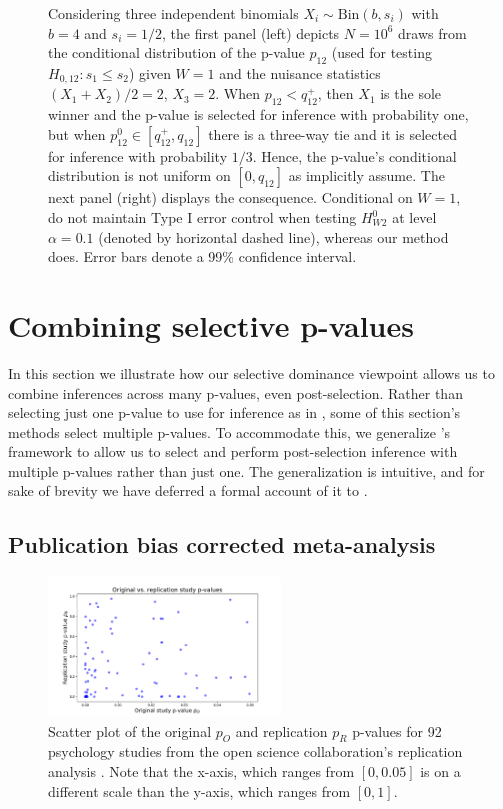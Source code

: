 \documentclass{article}
\begin{document}
\begin{figure}[]
    \caption{Considering three independent binomials $X_i \sim \text{Bin}(b, s_i)$ with $b=4$ and $s_i = 1/2$, the first panel (left) depicts $N=10^6$ draws from the conditional distribution of the p-value $p_{12}$ (used for testing $H_{0, 12}: s_1 \leq s_2$) given $W = 1$ and the nuisance statistics $(X_1 + X_2)/2 = 2$, $X_3=2$. When $p_{12}  < q^+_{12}$, then $X_1$ is the sole winner and the p-value is selected for inference with probability one, but when $p_{12}^0 \in [q^+_{12}, q_{12}]$ there is a three-way tie and it is selected for inference with probability $1/3$. Hence, the p-value's conditional distribution is not uniform on $[0, q_{12}]$ as \cite{Hung2019} implicitly assume. The next panel (right) displays the consequence. Conditional on $W=1$, \cite{Hung2019} do not maintain Type I error control when testing $H^{0}_{W2}$ at level $\alpha=0.1$ (denoted by horizontal dashed line), whereas our method does. Error bars denote a 99\% confidence interval.}
    \label{fig:error_control}
\end{figure}

\section{Combining selective p-values}
\label{sec:multiple}

In this section we illustrate how our selective dominance viewpoint allows us to combine inferences across many p-values, even post-selection. Rather than selecting just one p-value to use for inference as in , some of this section's methods select multiple p-values. To accommodate this, we generalize 's framework to allow us to select and perform post-selection inference with multiple p-values rather than just one. The generalization is intuitive, and for sake of brevity we have deferred a formal account of it to .

\subsection{Publication bias corrected meta-analysis}

\begin{figure}
    \centering
    \includegraphics[width=0.55\textwidth]{replication.pdf} %
    \caption{Scatter plot of the original $p_O$ and replication $p_R$ p-values for 92 psychology studies from the open science collaboration's replication analysis \cite{OSF}. Note that the x-axis, which ranges from $[0, 0.05]$ is on a different scale than the y-axis, which ranges from $[0, 1]$. }
    \label{fig:replication}
\end{figure}
\end{document}
